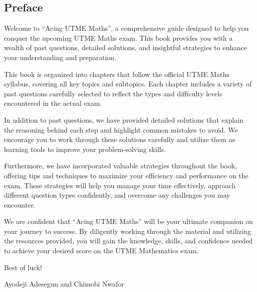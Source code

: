 \documentclass[a4paper]{book}
\begin{document}
\begin{frontmatter}
\clearpage
\tableofcontents
\clearpage

\chapter*{Preface}
Welcome to ``Acing UTME Maths'', a comprehensive guide designed to help you conquer the upcoming UTME Maths exam. This book provides you with a wealth of past questions, detailed solutions, and insightful strategies to enhance your understanding and preparation.

This book is organized into chapters that follow the official UTME Maths syllabus, covering all key topics and subtopics. Each chapter includes a variety of past questions carefully selected to reflect the types and difficulty levels encountered in the actual exam.

In addition to past questions, we have provided detailed solutions that explain the reasoning behind each step and highlight common mistakes to avoid. We encourage you to work through these solutions carefully and utilize them as learning tools to improve your problem-solving skills.

Furthermore, we have incorporated valuable strategies throughout the book, offering tips and techniques to maximize your efficiency and performance on the exam. These strategies will help you manage your time effectively, approach different question types confidently, and overcome any challenges you may encounter.

We are confident that ``Acing UTME Maths'' will be your ultimate companion on your journey to success. By diligently working through the material and utilizing the resources provided, you will gain the knowledge, skills, and confidence needed to achieve your desired score on the UTME Mathematics exam.

Best of luck!

Ayodeji Adesegun and Chimobi Nwafor
\clearpage
\end{frontmatter}

\mainmatter
\pagestyle{fancy}


%

%

%

%

%

%

%

%



%

%

%

%


\begin{backmatter}
\pagestyle{plain}

\end{backmatter}
\end{document}
